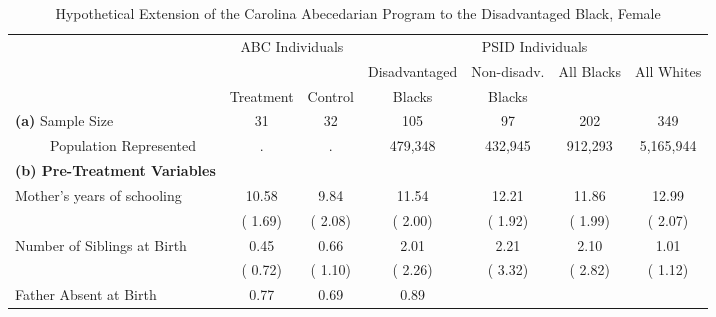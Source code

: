 \begin{table}[htbp]
\caption{\label{tab:tabfem_abc} Hypothetical Extension of the Carolina Abecedarian Program to the Disadvantaged Black, Female}\medskip
\footnotesize  \begin{center} \begin{tabular}{lcccccccc}  \hline \hline    
&\multicolumn{2}{c}{ABC Individuals} &\multicolumn{6}{c}{PSID Individuals}  \\[0.05cm]  \cline{2-3} \cline{5-9}   
 & \multicolumn{2}{c}{      }  & \multicolumn{2}{c}{Disadvantaged}  & \multicolumn{1}{c}{Non-disadv.}  & \multicolumn{2}{c}{All Blacks}  & \multicolumn{1}{c}{All Whites} \\  & \multicolumn{1}{c}{Treatment}  & \multicolumn{1}{c}{Control}  & \multicolumn{2}{c}{Blacks}  & \multicolumn{1}{c}{Blacks}  & \multicolumn{2}{c}{ } \\   \hline   
\textbf{(a)} Sample Size &31&           32& \multicolumn{2}{c}{          105} & \multicolumn{1}{c}{           97} &
\multicolumn{2}{c}{          202} &
\multicolumn{1}{c}{          349} 
 \\[0.05cm] 
\ \ \ \ \ Population Represented &.&            .& \multicolumn{2}{c}{      479,348} & \multicolumn{1}{c}{      432,945} &
\multicolumn{2}{c}{      912,293} &
\multicolumn{1}{c}{    5,165,944} 
 \\[0.2cm] \hline
\textbf{(b) Pre-Treatment Variables}  \\[0.2cm] 
Mother's years of schooling &        10.58 &         9.84 & \multicolumn{2}{c}{        11.54} &
\multicolumn{1}{c}{        12.21} &
\multicolumn{2}{c}{        11.86} &
\multicolumn{1}{c}{        12.99} 
 \\[0.05cm]  
 & (        1.69) & (        2.08) & \multicolumn{2}{c}{(        2.00)} &
\multicolumn{1}{c}{(        1.92)} &
\multicolumn{2}{c}{(        1.99)} &
\multicolumn{1}{c}{(        2.07)} 
 \\[0.2cm]  
Number of Siblings at Birth &         0.45 &         0.66 & \multicolumn{2}{c}{         2.01} &
\multicolumn{1}{c}{         2.21} &
\multicolumn{2}{c}{         2.10} &
\multicolumn{1}{c}{         1.01} 
 \\[0.05cm]  
 & (        0.72) & (        1.10) & \multicolumn{2}{c}{(        2.26)} &
\multicolumn{1}{c}{(        3.32)} &
\multicolumn{2}{c}{(        2.82)} &
\multicolumn{1}{c}{(        1.12)} 
 \\[0.2cm]  
Father Absent at Birth &         0.77 &         0.69 & \multicolumn{2}{c}{         0.89} &

\end{tabular}
\end{center}
\end{table}
